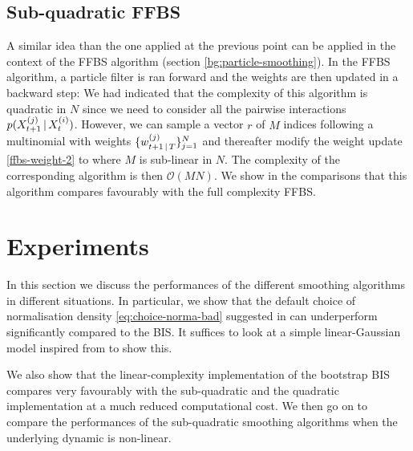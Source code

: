 \subsection{Sub-quadratic FFBS}
A similar idea than the one applied at the previous point can be applied in the context of the FFBS algorithm (section \ref{bg:particle-smoothing}).
In the FFBS algorithm, a particle filter is ran forward and the weights are then updated in a backward step:
%
%
We had indicated that the complexity of this algorithm is quadratic in $N$ since we need to consider all the pairwise interactions $p(X^{(j)}_{t+1}\,|\, X^{(i)}_{t})$. 
However, we can sample a vector $r$ of $M$ indices following a multinomial with weights $\{w^{(j)}_{t+1\,|\, T}\}_{j=1}^{N}$ and thereafter modify the weight update \eqref{ffbs-weight-2} to
%
%
where $M$ is sub-linear in $N$. The complexity of the corresponding algorithm is then $\mathcal O(MN)$. We show in the comparisons that this algorithm compares favourably with the full complexity FFBS. 

\section{\label{sec:TFSexp}Experiments}

In this section we discuss the performances of the different smoothing algorithms in different situations. 
In particular, we show that the default choice of normalisation density \eqref{eq:choice-norma-bad} suggested in \citep{briers10,fearnhead10} can underperform significantly compared to the BIS. It suffices to look at a simple linear-Gaussian model inspired from \citep{fearnhead10} to show this.

We also show that the linear-complexity implementation of the bootstrap BIS compares very favourably with the sub-quadratic and the quadratic implementation at a much reduced computational cost.  We then go on to compare the performances of the sub-quadratic smoothing algorithms when the underlying dynamic is non-linear.


